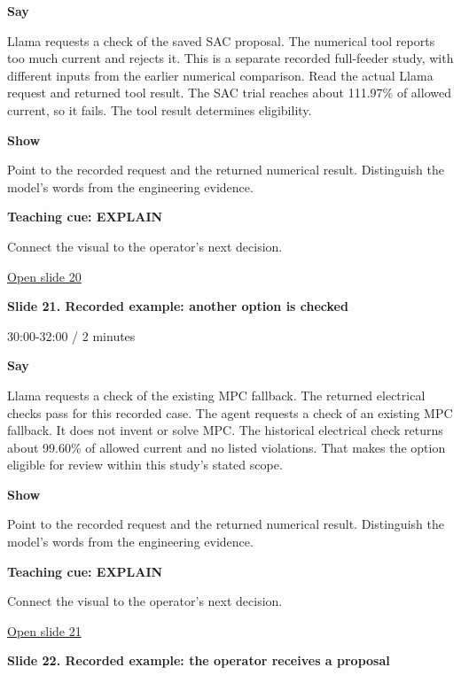 \documentclass[12pt,letterpaper]{article}
\begin{document}
\textbf{Say}\par Llama requests a check of the saved SAC proposal. The numerical tool reports too much current and rejects it. This is a separate recorded full-feeder study, with different inputs from the earlier numerical comparison. Read the actual Llama request and returned tool result. The SAC trial reaches about 111.97\% of allowed current, so it fails. The tool result determines eligibility.\par\medskip
\textbf{Show}\par Point to the recorded request and the returned numerical result. Distinguish the model's words from the engineering evidence.\par\medskip
\textbf{Teaching cue: EXPLAIN}\par Connect the visual to the operator's next decision.\par\medskip
\vfill\href{https://alaaselim-sudo.github.io/GridGuard-Agentic-AI-Tutorials/operator-cases/#/20}{Open slide 20}\par
\clearpage{}
{\Large\bfseries\color{IEEEBlue} Slide 21. Recorded example: another option is checked\par}\medskip
{\small\color{Slate} 30:00-32:00 /\allowbreak{} 2 minutes\par}\medskip
\textbf{Say}\par Llama requests a check of the existing MPC fallback. The returned electrical checks pass for this recorded case. The agent requests a check of an existing MPC fallback. It does not invent or solve MPC. The historical electrical check returns about 99.60\% of allowed current and no listed violations. That makes the option eligible for review within this study's stated scope.\par\medskip
\textbf{Show}\par Point to the recorded request and the returned numerical result. Distinguish the model's words from the engineering evidence.\par\medskip
\textbf{Teaching cue: EXPLAIN}\par Connect the visual to the operator's next decision.\par\medskip
\vfill\href{https://alaaselim-sudo.github.io/GridGuard-Agentic-AI-Tutorials/operator-cases/#/21}{Open slide 21}\par
\clearpage{}
{\Large\bfseries\color{IEEEBlue} Slide 22. Recorded example: the operator receives a proposal\par}\medskip
\end{document}
